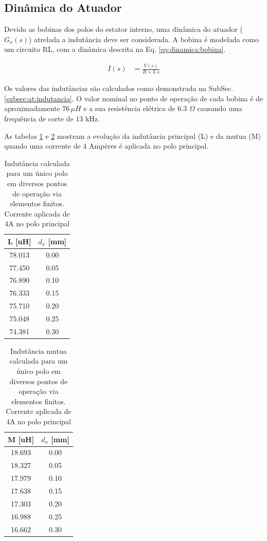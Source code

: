 \subsection{Dinâmica do Atuador}

Devido as bobinas dos polos do estator interno, uma dinâmica do atuador ($G_a(s)$) atrelada a indutância deve ser considerada. A bobina é modelada como um circuito RL, com a dinâmica descrita na Eq. \eqref{eq:dinamica:bobina}.

\begin{align}
	I(s) &= \frac{V(s)}{R + L \, s} 
	\label{eq:dinamica:bobina}
\end{align}

Os valores das indutâncias são calculados como demonstrada na SubSec. \ref{subsec:at:indutancia}. O valor nominal no ponto de operação de cada bobina é de aproximadamente $76 \, \mu H$ e a sua resistência elétrica de 6.3 $\Omega$ causando uma frequência de corte de $13$ kHz. 

As tabelas \ref{tab:dinamica:indutancia} e \ref{tab:dinamica:indutancia:mutua} mostram a evolução da indutância principal (L) e da mutua (M) quando uma corrente de 4 Ampères é aplicada no polo principal. 

\begin{table}[ht!]
	\centering
	\begin{tabular}{c c}
        L [uH]  & $d_x$ [mm] \\
        \hline \hline               
        78.013 & 0.00 \\
        77.450 & 0.05 \\
        76.890 & 0.10 \\
        76.333 & 0.15 \\
        75.710 & 0.20 \\
        75.048 & 0.25 \\
        74.381 & 0.30       
	\end{tabular} 
	\caption{Indutância calculada para um único polo em diversos pontos de operação via elementos finitos. Corrente aplicada de 4A no polo principal}
	\label{tab:dinamica:indutancia} 
\end{table} 

\begin{table}[ht!]
	\centering
	\begin{tabular}{c c}
        M [uH]  & $d_x$ [mm] \\
        \hline \hline               
         18.693 & 0.00 \\
         18.327 & 0.05 \\
         17.979 & 0.10 \\
         17.638 & 0.15 \\
         17.303 & 0.20 \\
         16.988 & 0.25 \\
         16.662 & 0.30       
	\end{tabular} 
	\caption{Indutância mutua calculada para um único polo em diversos pontos de operação via elementos finitos. Corrente aplicada de 4A no polo principal}
	\label{tab:dinamica:indutancia:mutua} 
\end{table} 

